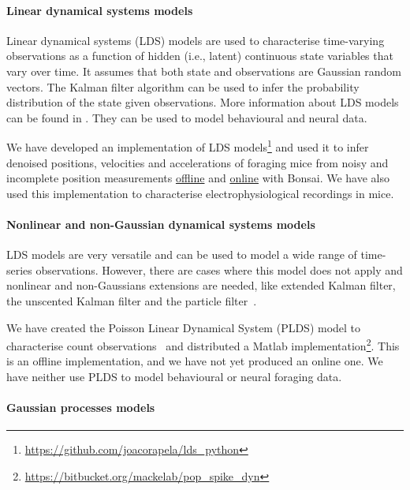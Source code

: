 \paragraph{Linear dynamical systems models}

Linear dynamical systems (LDS) models are used to characterise time-varying
observations as a function of hidden (i.e., latent) continuous state variables
that vary over time. It assumes that both state and observations are Gaussian
random vectors. The Kalman filter algorithm can be used to infer the
probability distribution of the state given observations. More information
about LDS models can be found in \citep[][part I]{durbinAndKoopman12}. They can
be used to model behavioural and neural data.

We have developed an implementation of LDS
models\footnote{\url{https://github.com/joacorapela/lds\_python}} and used it to infer denoised
positions, velocities and accelerations of foraging mice from noisy and
incomplete position measurements
\href{https://joacorapela.github.io/lds\_python/auto\_examples/tracking/plotFilterFWGMouseTrajectoryManualVsLearnedParams.html}{offline}
and
\href{https://bonsai-rx.org/machinelearning/examples/examples/LinearDynamicalSystems/Kinematics/ForagingMouse/README.html}{online}
with Bonsai.
%
We have also used this implementation to characterise electrophysiological recordings in mice.

\paragraph{Nonlinear and non-Gaussian dynamical systems models}

LDS models are very versatile and can be used to model a wide range of
time-series observations. However, there are cases where this model does not
apply and nonlinear and non-Gaussians extensions are needed, like extended
Kalman filter, the unscented Kalman filter and the particle
filter~\citep[][part II]{durbinAndKoopman12}.

We have created the Poisson Linear Dynamical System (PLDS) model to characterise count
observations~\citep{mackeEtAl15} and distributed a Matlab
implementation\footnote{\url{https://bitbucket.org/mackelab/pop\_spike\_dyn}}.
This is an offline implementation, and we have not yet produced an online one.
We have neither use PLDS to model behavioural or neural foraging data.

\paragraph{Gaussian processes models}

